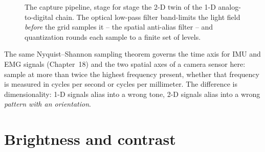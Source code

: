 \begin{figure}[H]
\centering
{}
\caption{The capture pipeline, stage for stage the 2-D twin of the 1-D
analog-to-digital chain. The optical low-pass filter band-limits the light field
\emph{before} the grid samples it -- the spatial anti-alias filter -- and
quantization rounds each sample to a finite set of levels.}
\label{ch30:fig-pipeline}
\end{figure}

\begin{connectionbox}
The same Nyquist--Shannon sampling theorem governs the time axis for IMU and EMG signals
(Chapter~18) and the two spatial axes of a camera sensor here: sample at more than twice
the highest frequency present, whether that frequency is measured in cycles per second or cycles per millimeter.
The difference is dimensionality: 1-D signals alias into a wrong tone, 2-D
signals alias into a wrong \emph{pattern with an orientation}.
\end{connectionbox}

\section{Brightness and contrast}
\label{ch30:brightness-contrast}

